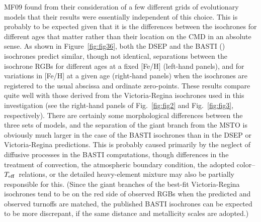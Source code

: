 \documentclass[12pt,preprint]{aastex}
\newcommand\teff{{T_{\rm eff}}}
\begin{document}
MF09 found from their consideration of a few different grids of evolutionary
models that their results were essentially independent of this choice.  This is
probably to be expected given that it is the differences between the isochrones
for different ages that matter rather than their location on the CMD in an
absolute sense.  As shown in Figure~\ref{fig:fig36}, both the DSEP and the
BASTI (\citealt{pcs06}) isochrones predict similar, though not identical,
separations between the isochrone RGBs for different ages at a fixed [Fe/H]
(left-hand panels), and for variations in [Fe/H] at a given age (right-hand
panels) when the isochrones are registered to the usual abscissa and ordinate
zero-points.  These results compare quite well with those derived from the
Victoria-Regina isochrones used in this investigation (see the right-hand panels
of Fig.~\ref{fig:fig2} and Fig.~\ref{fig:fig3}, respectively).  There are
certainly some morphological differences between the three sets of models, and
the separation of the giant branch from the MSTO is obviously much larger in
the case of the BASTI isochrones than in the DSEP or Victoria-Regina
predictions.  This is probably caused primarily by the neglect of diffusive
processes in the BASTI computations, though differences in the treatment of
convection, the atmospheric boundary condition, the adopted color--$\teff$\
relations, or the detailed heavy-element mixture may also be partially
responsible for this.  (Since the giant branches of the best-fit
Victoria-Regina isochrones tend to be on the red side of observed RGBs when the
predicted and observed turnoffs are matched, the published BASTI isochrones can
be expected to be more discrepant, if the same distance and metallicity 
scales are adopted.)
\end{document}
